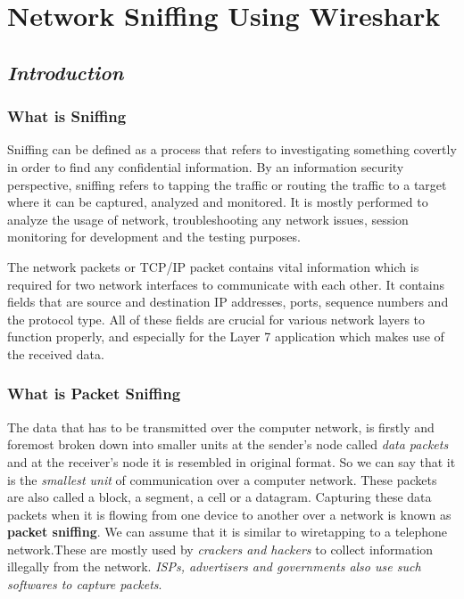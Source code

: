 \documentclass[a4paper,12pt]{report}
\begin{document}
\chapter{Network Sniffing Using Wireshark}

\section{\emph{Introduction}}

\subsection{What is Sniffing}

Sniffing can be defined as a process that refers to investigating
something covertly in order to find any confidential information. By an
information security perspective, sniffing refers to tapping the traffic
or routing the traffic to a target where it can be captured, analyzed
and monitored. It is mostly performed to analyze the usage of network,
troubleshooting any network issues, session monitoring for development
and the testing purposes.

The network packets or TCP/IP packet contains vital information which is
required for two network interfaces to communicate with each other. It
contains fields that are source and destination IP addresses, ports,
sequence numbers and the protocol type. All of these fields are crucial
for various network layers to function properly, and especially for the
Layer 7 application which makes use of the received data.

\subsection{What is Packet Sniffing}

The data that has to be transmitted over the computer network, is
firstly and foremost broken down into smaller units at the sender's node
called \emph{data packets} and at the receiver's node it is resembled in
original format. So we can say that it is the \emph{smallest unit} of
communication over a computer network. These packets are also called a
block, a segment, a cell or a datagram. Capturing these data packets
when it is flowing from one device to another over a network is known as
\textbf{packet sniffing}. We can assume that it is similar to
wiretapping to a telephone network.These are mostly used by
\emph{crackers and hackers} to collect information illegally from the
network. \emph{ISPs, advertisers and governments also use such softwares
to capture packets}.
\end{document}
